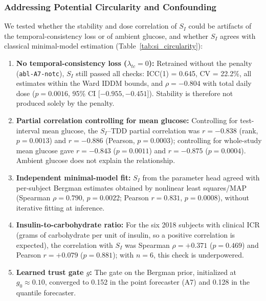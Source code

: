 \documentclass[journal]{IEEEtran}
\begin{document}
\subsubsection{Addressing Potential Circularity and Confounding}
We tested whether the stability and dose correlation of $S_I$ could be artifacts of the temporal-consistency loss or of ambient glucose, and whether $S_I$ agrees with classical minimal-model estimation (Table~\ref{tab:si_circularity}):

\begin{enumerate}
    \item \textbf{No temporal-consistency loss ($\lambda_{tc} = 0$):} Retrained without the penalty (\texttt{abl-A7-notc}), $S_I$ still passed all checks: ICC(1) = 0.645, CV = 22.2\%, all estimates within the Ward IDDM bounds, and $\rho = -0.804$ with total daily dose ($p = 0.0016$, 95\% CI [$-0.955, -0.451$]). Stability is therefore not produced solely by the penalty.
    \item \textbf{Partial correlation controlling for mean glucose:} Controlling for test-interval mean glucose, the $S_I$--TDD partial correlation was $r = -0.838$ (rank, $p = 0.0013$) and $r = -0.886$ (Pearson, $p = 0.0003$); controlling for whole-study mean glucose gave $r = -0.843$ ($p = 0.0011$) and $r = -0.875$ ($p = 0.0004$). Ambient glucose does not explain the relationship.
    \item \textbf{Independent minimal-model fit:} $S_I$ from the parameter head agreed with per-subject Bergman estimates obtained by nonlinear least squares/MAP (Spearman $\rho = 0.790$, $p = 0.0022$; Pearson $r = 0.831$, $p = 0.0008$), without iterative fitting at inference.
    \item \textbf{Insulin-to-carbohydrate ratio:} For the six 2018 subjects with clinical ICR (grams of carbohydrate per unit of insulin, so a positive correlation is expected), the correlation with $S_I$ was Spearman $\rho = +0.371$ ($p = 0.469$) and Pearson $r = +0.079$ ($p = 0.881$); with $n = 6$, this check is underpowered.
    \item \textbf{Learned trust gate $g$:} The gate on the Bergman prior, initialized at $g_0 \approx 0.10$, converged to 0.152 in the point forecaster (A7) and 0.128 in the quantile forecaster.
\end{enumerate}
\end{document}
